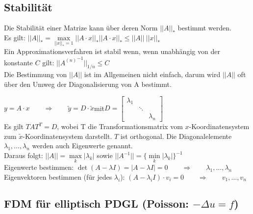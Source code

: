 \subsection{Stabilität}
Die Stabilität einer Matrize kann über deren Norm $||A||_*$ bestimmt werden.\\

Es gilt: $||A||_*=\max\limits_{||x||_*=1}||A\cdot x||_*$\qquad$||A\cdot x||_*\leq||A||~||x||_*$\\

Ein Approximationsverfahren ist stabil wenn, wenn unabhängig von der konstante $C$ gilt:
$\boxed{||{A^{(n)}}^{-1}||_{1/n}\leq C}$\\



Die Bestimmung von $||A||$ ist im Allgemeinen nicht einfach, darum wird $||A||$ oft über den Umweg der Diagonalisierung von A bestimmt.

$y=A\cdot x\qquad\Rightarrow\qquad\tilde{y}=D\cdot\tilde{x}$\qquad mit\qquad $D=\begin{bmatrix}\lambda_1&&\\&\ddots&\\&&\lambda_n\end{bmatrix}$\\

Es gilt $TAT^T=D$, wobei T die Transformationsmatrix vom $x$-Koordinatensystem zum $\tilde{x}$-Koordinatensystem darstellt. $T$ ist orthogonal.
Die Diagonalelemente $\lambda_1,\ldots,\lambda_n$ werden auch Eigenwerte genannt.\\

Daraus folgt: $\boxed{||A||=\max\limits_{k}|\lambda_k|}$ sowie $\boxed{||A^{-1}||=\{\min\limits_{k}|\lambda_k|\}^{-1}}$\\

Eigenwerte bestimmen: $\boxed{\det(A-\lambda I)=|A-\lambda I|=0}\qquad \Rightarrow \qquad \lambda_1,\ldots,\lambda_n$\\
Eigenvektoren bestimmen (für jedes $\lambda_i$): $(A-\lambda_i I) \cdot v_i=0\qquad \Rightarrow \qquad v_1,\ldots,v_n$\\

\subsection{FDM für elliptisch PDGL (Poisson: $-\Delta u = f$)}

